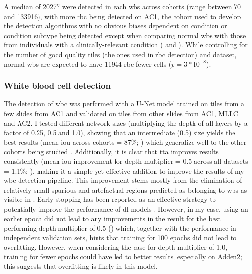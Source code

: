 A median of 20277 were detected in each \ac{wbs} across cohorts (range between 70 and 133916), with more \ac{rbc} being detected on AC1, the cohort used to develop the detection algorithms with no obvious biases dependent on condition or condition subtype being detected except when comparing normal \ac{wbs} with those from individuals with a clinically-relevant condition ( and ). While controlling for the number of good quality tiles (the ones used in \ac{rbc} detection) and dataset, normal \ac{wbs} are expected to have 11944 \ac{rbc} fewer cells ($p=3*10^{-8}$). 

\begin{figure}[!ht]
    \label{fig:rbc-count-coarse}
\end{figure}

\begin{figure}[!ht]
    \label{fig:rbc-count-fine}
\end{figure}

\subsubsection{White blood cell detection}

The detection of \ac{wbc} was performed with a U-Net model \cite{Ronneberger2015-do} trained on tiles from a few slides from AC1 and validated on tiles from other slides from AC1, MLLC and AC2. I tested different network sizes (multiplying the depth of all layers by a factor of 0.25, 0.5 and 1.0), showing that an intermediate (0.5) size yields the best results (mean \ac{iou} across cohorts = 87\%; ) which generalize well to the other cohorts being studied . Additionally, it is clear that \ac{tta} improves results consistently (mean \ac{iou} improvement for depth multiplier = 0.5 across all datasets = 1.1\%; ), making it a simple yet effective addition to improve the results of my \ac{wbc} detection pipeline. This improvement stems mostly from the elimination of relatively small spurious and artefactual regions predicted as belonging to \ac{wbs} as visible in . Early stopping has been reported as an effective strategy to potentially improve the performance of \ac{dl} models \cite{Prechelt2012-xf}. However, in my case, using an earlier epoch did not lead to any improvements in the result for the best performing depth multiplier of 0.5 () which, together with the performance in independent validation sets, hints that training for 100 epochs did not lead to overfitting. However, when considering the case for depth multiplier of 1.0, training for fewer epochs could have led to better results, especially on Adden2; this suggests that overfitting is likely in this model.

